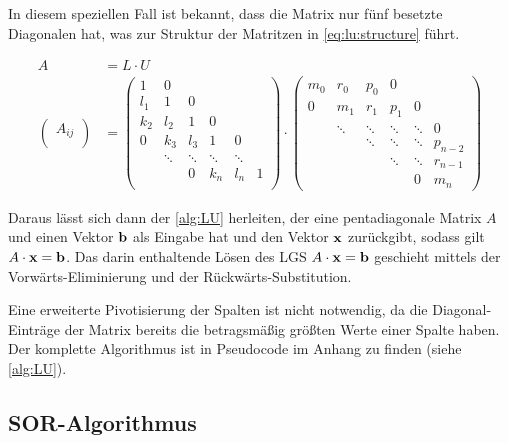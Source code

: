 In diesem speziellen Fall ist bekannt, dass die Matrix nur fünf besetzte Diagonalen hat, was zur Struktur der Matritzen in \autoref{eq:lu:structure} führt.

\begin{align}
A &= L \cdot U \\
\label{eq:lu:structure}
\begin{pmatrix}
A_{ij}\\
\end{pmatrix}
&= 
\begin{pmatrix}
1 & 0 &  \\
l_1 & 1 & 0 &\\
k_2 & l_2 & 1 & 0 &\\
0 & k_3 & l_3 & 1 & 0 &\\
  &   \ddots  & \ddots & \ddots & \ddots\\
  & & 0& k_n & l_n & 1\\
\end{pmatrix}
\cdot
\begin{pmatrix}
m_0 & r_0 & p_0 & 0 &  \\
0 & m_1 & r_1 & p_1 & 0 &  \\
 & \ddots& \ddots & \ddots & \ddots & 0\\
 & & \ddots&\ddots&\ddots & p_{n-2}\\
 & & &\ddots&\ddots & r_{n-1}\\
&&  & &0& m_n 
\end{pmatrix}
\end{align}

Daraus lässt sich dann der \autoref{alg:LU} herleiten, der eine pentadiagonale Matrix $A$ und einen Vektor $\mathbf b$ als Eingabe hat und den Vektor $\mathbf x$ zurückgibt, sodass gilt $A \cdot \mathbf x = \mathbf b$. Das darin enthaltende Lösen des LGS $A\cdot \mathbf x = \mathbf b$ geschieht mittels der Vorwärts-Eliminierung und der Rückwärts-Substitution. 

Eine erweiterte Pivotisierung der Spalten ist nicht notwendig, da die Diagonal-Einträge der Matrix bereits die betragsmäßig größten Werte einer Spalte haben. Der komplette Algorithmus ist in Pseudocode im Anhang zu finden (siehe \ref{alg:LU}).



\subsection{SOR-Algorithmus}
\label{sec:maths:sor}

